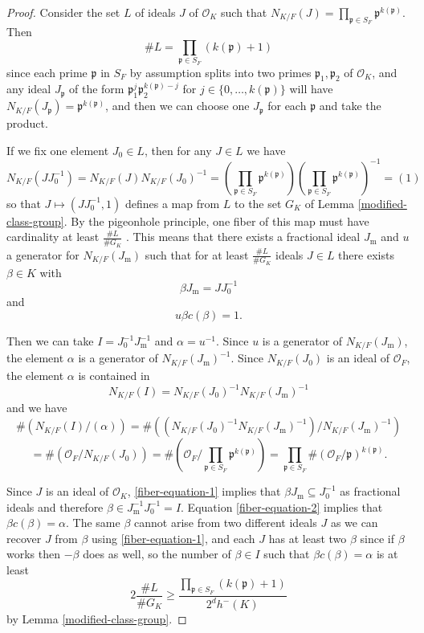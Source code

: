 \documentclass[12pt]{amsart}
\theoremstyle{remark}
\theoremstyle{definition}
\begin{document}
\begin{proof} Consider the set $L$ of ideals $J$ of $\mathcal O_K$ such that $N_{K/F}(J)=\prod_{\mathfrak p \in S_F} \mathfrak p^{k(\mathfrak p)}$. Then \[\# L = \prod_{\mathfrak p \in S_F} (k(\mathfrak p)+1  )\] since each prime $\mathfrak p$ in $S_F$ by assumption splits into two primes $\mathfrak p_1,\mathfrak p_2$ of $\mathcal O_K$, and any ideal $J_\mathfrak p$ of the form $\mathfrak p_1^j \mathfrak p_2^{k(\mathfrak p)-j}$ for $j\in \{0,\dots,k(\mathfrak p)\}$ will have $N_{K/F}(J_{\mathfrak p})= \mathfrak p^{k(\mathfrak p)}$, and then we can choose one $J_\mathfrak p$ for each $\mathfrak p$ and take the product.

If we fix one element $J_0 \in L$, then for any $J \in L$ we have 
\[ N_{K/F} ( J J_0^{-1})  = N_{K/F}(J)  N_{K/F}(J_0)^{-1}= (\prod_{\mathfrak p \in S_F} \mathfrak p^{k(\mathfrak p)}) (\prod_{\mathfrak p \in S_F} \mathfrak p^{k(\mathfrak p)})^{-1}  = (1) \] so that $J \mapsto ( J J_0^{-1}, 1)$ defines a map from $L$ to the set $G_K$ of Lemma \ref{modified-class-group}. By the pigeonhole principle, one fiber of this map must have cardinality at least $\frac{\#L}{\#G_K}$ . This means that there exists a fractional ideal $J_{\mathrm m}$ and $u $ a generator for $ N_{K/F}( J_{\mathrm m}) $ such that for at least $\frac{\#L}{\#G_K}$ ideals $J \in L$ there exists $\beta \in K$ with \begin{equation}\label{fiber-equation-1} \beta J_{\mathrm m} =  J J_0^{-1} \end{equation} and \begin{equation}\label{fiber-equation-2} u \beta c(\beta)=1.\end{equation}

Then we can take $I = J_0^{-1} J_{\mathrm m}^{-1} $ and $\alpha = u^{-1}$.  Since $u$ is a generator of $N_{K/F}(J_{\mathrm m})$, the element $\alpha$ is a generator of $N_{K/F}(J_{\mathrm m})^{-1}$. Since $N_{K/F}(J_0)$ is an ideal of $\mathcal O_F$,  the element $\alpha$ is contained in 
 \[N_{K/F}(I) = N_{K/F}(J_0)^{-1} N_{K/F}(J_{\mathrm m})^{-1}\] and we have
 \[ \# (N_{K/F}(I)/(\alpha)) = \#( (N_{K/F}(J_0)^{-1} N_{K/F}(J_{\mathrm m})^{-1})/ N_{K/F}(J_{\mathrm m})^{-1} )\] \[= \# (\mathcal O_F/ N_{K/F}(J_0)) = \#(\mathcal O_F/ \prod_{\mathfrak p \in S_F} \mathfrak p^{k(\mathfrak p)})=  \prod_{\mathfrak p\in S_F} \# (\mathcal O_F/\mathfrak p)^{k(\mathfrak p)}.\] 

Since $J$ is an ideal of $\mathcal O_K$, \eqref{fiber-equation-1} implies that $\beta J_{\mathrm m} \subseteq J_0^{-1}$ as fractional ideals and therefore $\beta \in J_{\mathrm m}^{-1} J_0^{-1}=I$.  Equation \eqref{fiber-equation-2} implies that $\beta c(\beta)=\alpha$.  The same $\beta$ cannot arise from two different ideals $J$ as we can recover $J$ from $\beta$ using \eqref{fiber-equation-1}, and each $J$ has at least two $\beta$ since if $\beta$ works then $-\beta$ does as well, so the number of $\beta \in I$ such that $\beta c(\beta)=\alpha$ is at least
\[ 2  \frac{ \#L}{\#G_K} \geq  \frac{ \prod_{\mathfrak p \in S_F} (k(\mathfrak p)+1  )}{ 2^d h^{-}(K)}\] by Lemma \ref{modified-class-group}. \end{proof}
\end{document}
